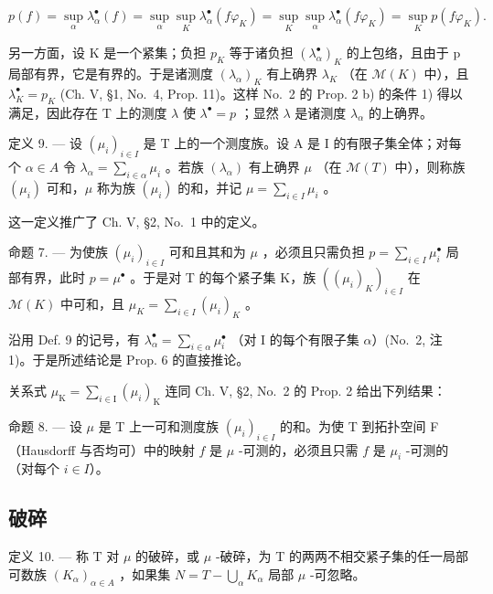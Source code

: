 \[
p (f) = \sup _ {\alpha} \lambda_ {\alpha} ^ {\bullet} (f) = \sup _ {\alpha} \sup _ {K} \lambda_ {\alpha} ^ {\bullet} (f \varphi_ {K}) = \sup _ {K} \sup _ {\alpha} \lambda_ {\alpha} ^ {\bullet} (f \varphi_ {K}) = \sup _ {K} p (f \varphi_ {K}).
\]

另一方面，设 K 是一个紧集；负担 \(p_{K}\) 等于诸负担 \((\lambda_{\alpha}^{\bullet})_{K}\) 的上包络，且由于 p 局部有界，它是有界的。于是诸测度 \((\lambda_{\alpha})_{K}\) 有上确界 \(\lambda_{K}\) （在 \(\mathcal{M}(K)\) 中），且 \(\lambda_{K}^{\bullet}=p_{K}\) (Ch. V, §1, No.~4, Prop. 11)。这样 No.~2 的 Prop. 2 b) 的条件 1) 得以满足，因此存在 T 上的测度 \(\lambda\) 使 \(\lambda^{\bullet}=p\) ；显然 \(\lambda\) 是诸测度 \(\lambda_{\alpha}\) 的上确界。

定义 9. --- 设 \((\mu_i)_{i \in I}\) 是 T 上的一个测度族。设 A 是 I 的有限子集全体；对每个 \(\alpha \in A\) 令 \(\lambda_\alpha = \sum_{i \in \alpha} \mu_i\) 。若族 \((\lambda_\alpha)\) 有上确界 \(\mu\) （在 \(\mathcal{M}(T)\) 中），则称族 \((\mu_i)\) 可和，\(\mu\) 称为族 \((\mu_i)\) 的和，并记 \(\mu = \sum_{i \in I} \mu_i\) 。

这一定义推广了 Ch. V, §2, No.~1 中的定义。

命题 7. --- 为使族 \((\mu_i)_{i \in I}\) 可和且其和为 \(\mu\) ，必须且只需负担 \(p = \sum_{i \in I} \mu_i^\bullet\) 局部有界，此时 \(p = \mu^\bullet\) 。于是对 T 的每个紧子集 K，族 \(\left((\mu_i)_K\right)_{i \in I}\) 在 \(\mathcal{M}(K)\) 中可和，且 \(\mu_K = \sum_{i \in I} (\mu_i)_K\) 。

沿用 Def. 9 的记号，有 \(\lambda_{\alpha}^{\bullet} = \sum_{i\in \alpha}\mu_{i}^{\bullet}\) （对 I 的每个有限子集 \(\alpha\)）(No.~2, 注 1)。于是所述结论是 Prop. 6 的直接推论。

关系式 \(\mu_{\mathrm{K}} = \sum_{i\in \mathrm{I}}(\mu_i)_{\mathrm{K}}\) 连同 Ch. V, §2, No.~2 的 Prop. 2 给出下列结果：

命题 8. --- 设 \(\mu\) 是 T 上一可和测度族 \((\mu_i)_{i \in I}\) 的和。为使 T 到拓扑空间 F（Hausdorff 与否均可）中的映射 \(f\) 是 \(\mu\) -可测的，必须且只需 \(f\) 是 \(\mu_i\) -可测的（对每个 \(i \in I\)）。

\subsection{破碎}

定义 10. --- 称 T 对 \(\mu\) 的破碎，或 \(\mu\) -破碎，为 T 的两两不相交紧子集的任一局部可数族 \((K_{\alpha})_{\alpha \in A}\) ，如果集 \(N = T - \bigcup_{\alpha} K_{\alpha}\) 局部 \(\mu\) -可忽略。

